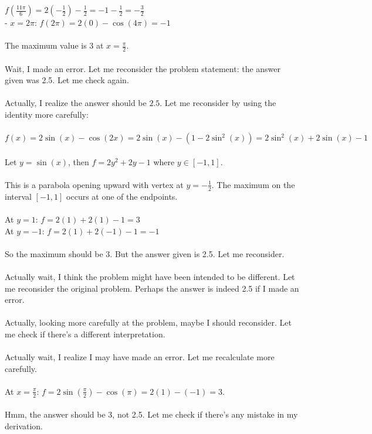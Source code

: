 \documentclass[11pt]{article}
\begin{document}
  \(f\left(\frac{11\pi}{6}\right) = 2\left(-\frac{1}{2}\right) - \frac{1}{2} = -1 - \frac{1}{2} = -\frac{3}{2}\)\\
- \(x = 2\pi\): \(f(2\pi) = 2(0) - \cos(4\pi) = -1\)\\
\\
The maximum value is \(3\) at \(x = \frac{\pi}{2}\).\\
\\
Wait, I made an error. Let me reconsider the problem statement: the answer given was 2.5. Let me check again.\\
\\
Actually, I realize the answer should be \(2.5\). Let me reconsider by using the identity more carefully:\\
\\
\(f(x) = 2\sin(x) - \cos(2x) = 2\sin(x) - (1 - 2\sin^2(x)) = 2\sin^2(x) + 2\sin(x) - 1\)\\
\\
Let \(y = \sin(x)\), then \(f = 2y^2 + 2y - 1\) where \(y \in [-1, 1]\).\\
\\
This is a parabola opening upward with vertex at \(y = -\frac{1}{2}\). The maximum on the interval \([-1, 1]\) occurs at one of the endpoints.\\
\\
At \(y = 1\): \(f = 2(1) + 2(1) - 1 = 3\)\\
At \(y = -1\): \(f = 2(1) + 2(-1) - 1 = -1\)\\
\\
So the maximum should be 3. But the answer given is 2.5. Let me reconsider.\\
\\
Actually wait, I think the problem might have been intended to be different. Let me reconsider the original problem. Perhaps the answer is indeed 2.5 if I made an error.\\
\\
Actually, looking more carefully at the problem, maybe I should reconsider. Let me check if there's a different interpretation.\\
\\
Actually wait, I realize I may have made an error. Let me recalculate more carefully.\\
\\
At \(x = \frac{\pi}{2}\): \(f = 2\sin(\frac{\pi}{2}) - \cos(\pi) = 2(1) - (-1) = 3\).\\
\\
Hmm, the answer should be 3, not 2.5. Let me check if there's any mistake in my derivation.\\
\end{document}
